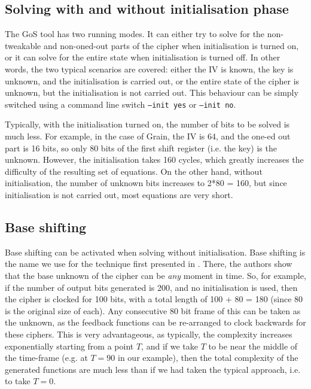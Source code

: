 \documentclass{llncs}
\begin{document}
\subsection{Solving with and without initialisation phase}
The GoS tool has two running modes. It can either try to solve for the non-tweakable and non-oned-out parts of the cipher when initialisation is turned on, or it can solve for the entire state when initialisation is turned off. In other words, the two typical scenarios are covered: either the IV is known, the key is unknown, and the initialisation is carried out, or the entire state of the cipher is unknown, but the initialisation is not carried out. This behaviour can be simply switched using a command line switch \texttt{--init yes} or \texttt{--init no}.

Typically, with the initialisation turned on, the number of bits to be solved is much less. For example, in the case of Grain, the IV is 64, and the one-ed out part is 16 bits, so only 80 bits of the first shift register (i.e. the key) is the unknown. However, the initialisation takes 160 cycles, which greatly increases the difficulty of the resulting set of equations. On the other hand, without initialisation, the number of unknown bits increases to 2*80 = 160, but since initialisation is not carried out, most equations are very short.

\subsection{Base shifting}
Base shifting can be activated when solving without initialisation. Base shifting is the name we use for the technique first presented in \cite[Sect. 4.3]{DBLP:conf/sat/SoosNC09}. There, the authors show that the base unknown of the cipher can be \emph{any} moment in time. So, for example, if the number of output bits generated is 200, and no initialisation is used, then the cipher is clocked for 100 bits, with a total length of 100 + 80 = 180 (since 80 is the original size of each). Any consecutive 80 bit frame of this can be taken as the unknown, as the feedback functions can be re-arranged to clock backwards for these ciphers. This is very advantageous, as typically, the complexity increases exponentially starting from a point $T$, and if we take $T$ to be near the middle of the time-frame (e.g. at $T=90$ in our example), then the total complexity of the generated functions are much less than if we had taken the typical approach, i.e. to take $T=0$.
\end{document}
